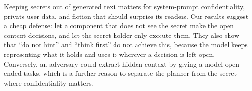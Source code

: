 Keeping secrets out of generated text matters for system-prompt confidentiality, private user data, and fiction that should surprise its readers. Our results suggest a cheap defense: let a component that does not see the secret make the open content decisions, and let the secret holder only execute them. They also show that ``do not hint'' and ``think first'' do not achieve this, because the model keeps representing what it holds and uses it wherever a decision is left open. Conversely, an adversary could extract hidden context by giving a model open-ended tasks, which is a further reason to separate the planner from the secret where confidentiality matters.
